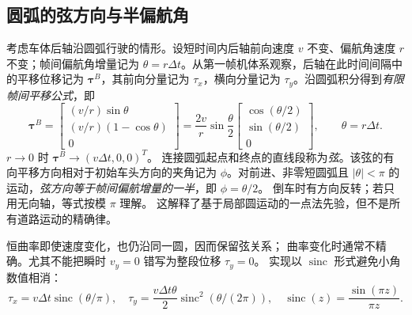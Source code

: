 \documentclass[UTF8,a4paper,fontset=fandol,11pt]{ctexart}
\newcommand{\vct}[1]{\bm #1}
\begin{document}
\subsection{圆弧的弦方向与半偏航角}
考虑车体后轴沿圆弧行驶的情形。设短时间内后轴前向速度 $v$ 不变、偏航角速度 $r$ 不变；帧间偏航角增量记为 $\theta=r\Delta t$。从第一帧机体系观察，后轴在此时间间隔中的平移位移记为 $\vct\tau^B$，其前向分量记为 $\tau_x$，横向分量记为 $\tau_y$。沿圆弧积分得到\emph{有限帧间平移公式}，即
\begin{equation}\label{eq:arc}
 \vct\tau^B=
 \begin{bmatrix}(v/r)\sin\theta\\(v/r)(1-\cos\theta)\\0\end{bmatrix}
 =\frac{2v}{r}\sin\frac\theta2
 \begin{bmatrix}\cos(\theta/2)\\\sin(\theta/2)\\0\end{bmatrix},
 \qquad\theta=r\Delta t.
\end{equation}
$r\to0$ 时 $\vct\tau^B\to(v\Delta t,0,0)^T$。
连接圆弧起点和终点的直线段称为\emph{弦}。该弦的有向平移方向相对于初始车头方向的夹角记为 $\phi$。对前进、非零短圆弧且 $|\theta|<\pi$ 的运动，\emph{弦方向等于帧间偏航增量的一半}，即 $\phi=\theta/2$。
倒车时有方向反转；若只用无向轴，等式按模 $\pi$ 理解。
这解释了基于局部圆运动的一点法先验\cite{onepoint,ijcv}，但不是所有道路运动的精确律。

恒曲率即使速度变化，也仍沿同一圆，因而保留弦关系；
曲率变化时通常不精确。尤其不能把瞬时 $v_y=0$ 错写为整段位移 $\tau_y=0$。
实现以 $\operatorname{sinc}$ 形式避免小角数值相消：
\begin{equation}
 \tau_x=v\Delta t\operatorname{sinc}(\theta/\pi),\quad
 \tau_y=\frac{v\Delta t\theta}{2}
     \operatorname{sinc}^2(\theta/(2\pi)),
 \quad\operatorname{sinc}(z)=\frac{\sin(\pi z)}{\pi z}.
\end{equation}
\end{document}
